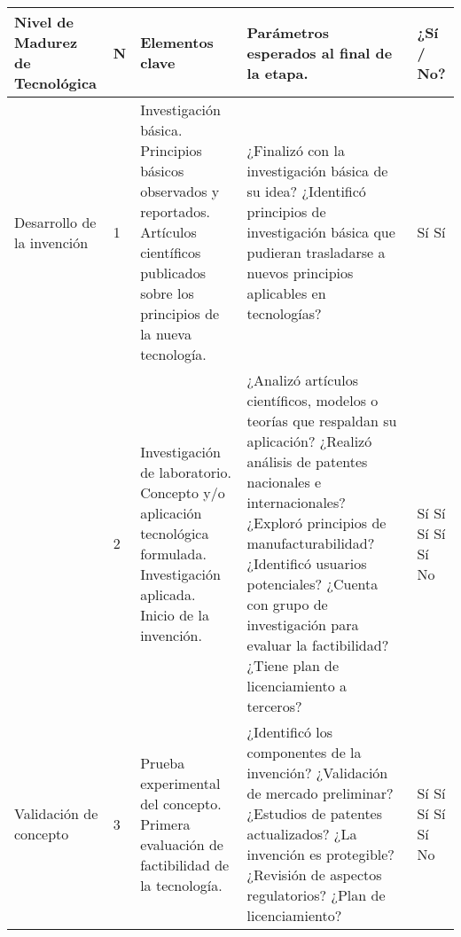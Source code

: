 \begin{longtable}{|p{2.5cm}|p{0.5cm}|p{4cm}|p{4cm}|p{1cm}|}
\hline
\textbf{Nivel de Madurez de Tecnológica} & 
\textbf{N} & 
\textbf{Elementos clave} & 
\textbf{Parámetros esperados al final de la etapa.} & 
\textbf{¿Sí / No?} \\
\hline
\endfirsthead

\hline
\endfoot

\hline
\endlastfoot

Desarrollo de la invención & 1 &
Investigación básica. Principios básicos observados y reportados. Artículos científicos publicados sobre los principios de la nueva tecnología. &
¿Finalizó con la investigación básica de su idea? \newline
¿Identificó principios de investigación básica que pudieran trasladarse a nuevos principios aplicables en tecnologías? & 
Sí \newline Sí \\
\hline

& 2 &
Investigación de laboratorio. Concepto y/o aplicación tecnológica formulada. Investigación aplicada. Inicio de la invención. &
¿Analizó artículos científicos, modelos o teorías que respaldan su aplicación? \newline
¿Realizó análisis de patentes nacionales e internacionales? \newline
¿Exploró principios de manufacturabilidad? \newline
¿Identificó usuarios potenciales? \newline
¿Cuenta con grupo de investigación para evaluar la factibilidad? \newline
¿Tiene plan de licenciamiento a terceros? & 
Sí \newline Sí \newline Sí \newline Sí \newline Sí \newline No \\
\hline

Validación de concepto & 3 &
Prueba experimental del concepto. Primera evaluación de factibilidad de la tecnología. &
¿Identificó los componentes de la invención? \newline
¿Validación de mercado preliminar? \newline
¿Estudios de patentes actualizados? \newline
¿La invención es protegible? \newline
¿Revisión de aspectos regulatorios? \newline
¿Plan de licenciamiento? &
Sí \newline Sí \newline Sí \newline Sí \newline Sí \newline No \\
\hline


\end{longtable}
